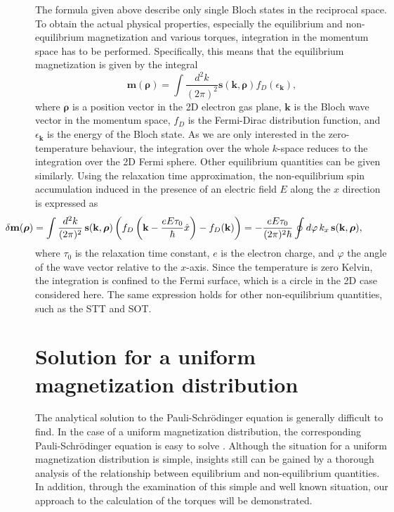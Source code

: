 \documentclass[12pt]{iopart}
\begin{document}
The formula given above describe only single Bloch states in the reciprocal space. To obtain the actual physical properties, especially the equilibrium and non-equilibrium magnetization and various torques, integration in the momentum space has to be performed. Specifically, this means that the equilibrium magnetization is given by the integral
\begin{equation}
\textbf{m}(\bm {\rho}) = \int \frac{d^2 k} {(2\pi)^2} \textbf{s}(\textbf{k}, \bm {\rho}) f_D(\epsilon_\textbf{k}),
\end{equation}
where $\bm {\rho}$ is a position vector in the 2D electron gas plane, $\textbf{k}$ is the Bloch wave vector in the momentum space, $f_D$ is the Fermi-Dirac distribution function, and $\epsilon_\textbf{k}$ is the energy of the Bloch state. As we are only interested in the zero-temperature behaviour, the integration over the whole $k$-space reduces to the integration over the 2D Fermi sphere. Other equilibrium quantities can be given similarly. Using the relaxation time approximation, the non-equilibrium spin accumulation induced in the presence of an electric field $E$ along the $x$ direction is expressed as
\begin{equation}
\hspace {-2 cm} \delta \textbf{m}(\bm {\rho}) = \int \frac{d^2 k} {(2\pi)^2}\, \textbf{s}(\textbf{k}, \bm {\rho}) \left( f_D \left( \textbf{k} - \frac {e E \tau_0} {\hbar} \hat {x} \right) - f_D(\textbf{k}) \right) = - \frac{e E \tau_0} {(2\pi)^2\hbar} \oint d\varphi\, k_x\, \textbf{s}(\textbf{k}, \bm {\rho}),
\end{equation}
where $\tau_0$ is the relaxation time constant, $e$ is the electron charge, and $\varphi$ the angle of the wave vector relative to the $x$-axis. Since the temperature is zero Kelvin, the integration is confined to the Fermi surface, which is a circle in the 2D case considered here. The same expression holds for other non-equilibrium quantities, such as the STT and SOT.
\section{Solution for a uniform magnetization distribution}
\label{uniform}
The analytical solution to the Pauli-Schr\"{o}dinger equation is generally difficult to find. In the case of a uniform magnetization distribution, the corresponding Pauli-Schr\"{o}dinger equation is easy to solve \cite{Calvo}. Although the situation for a uniform magnetization distribution is simple, insights still can be gained by a thorough analysis of the relationship between equilibrium and non-equilibrium quantities. In addition, through the examination of this simple and well known situation, our approach to the calculation of the torques will be demonstrated.
\end{document}
